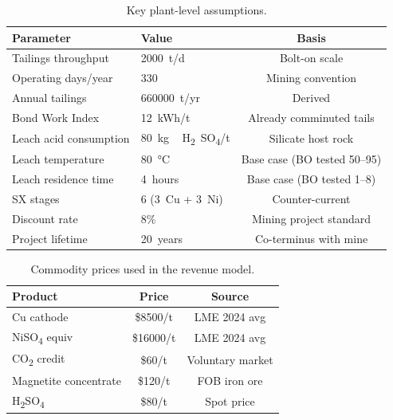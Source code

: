 \documentclass[11pt,a4paper]{article}
\begin{document}
\begin{table}[H]
\centering
\caption{Key plant-level assumptions.}
\label{tab:plant_params}
\begin{tabular}{@{}llc@{}}
\toprule
\textbf{Parameter} & \textbf{Value} & \textbf{Basis} \\
\midrule
Tailings throughput      & \num{2000}~t/d                 & Bolt-on scale \\
Operating days/year      & 330                            & Mining convention \\
Annual tailings          & \num{660000}~t/yr              & Derived \\
Bond Work Index          & \SI{12}{kWh/t}                 & Already comminuted tails \\
Leach acid consumption   & \SI{80}{kg\,H_2SO_4/t}         & Silicate host rock \\
Leach temperature        & \SI{80}{\celsius}              & Base case (BO tested 50--95) \\
Leach residence time     & 4~hours                        & Base case (BO tested 1--8) \\
SX stages                & 6 (3~Cu + 3~Ni)               & Counter-current \\
Discount rate            & 8\%                            & Mining project standard \\
Project lifetime         & 20~years                       & Co-terminus with mine \\
\bottomrule
\end{tabular}
\end{table}

\begin{table}[H]
\centering
\caption{Commodity prices used in the revenue model.}
\label{tab:prices}
\begin{tabular}{@{}lcc@{}}
\toprule
\textbf{Product} & \textbf{Price} & \textbf{Source} \\
\midrule
Cu cathode                    & \$\num{8500}/t    & LME 2024 avg \\
NiSO\textsubscript{4} equiv  & \$\num{16000}/t   & LME 2024 avg \\
CO\textsubscript{2} credit   & \$60/t            & Voluntary market \\
Magnetite concentrate         & \$120/t           & FOB iron ore \\
H\textsubscript{2}SO\textsubscript{4}  & \$80/t  & Spot price \\
\bottomrule
\end{tabular}
\end{table}
\end{document}
